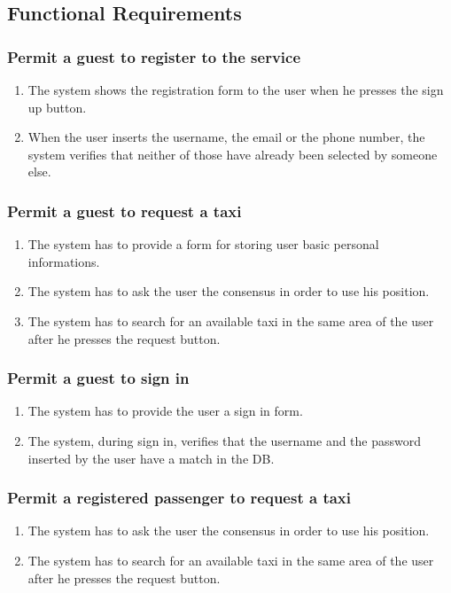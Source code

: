 	\subsection{Functional Requirements}
		\subsubsection{Permit a guest to register to the service}
			\begin{enumerate}[label=\bfseries R\arabic*:]
				\item The system shows the registration form to the user when he presses the sign up button.
				\item When the user inserts the username, the email or the phone number, the system verifies that neither of those have already been selected by someone else.
			\end{enumerate}
		\subsubsection{Permit a guest to request a taxi}
			\begin{enumerate}[label=\bfseries R\arabic*:]
				\item The system has to provide a form for storing user basic personal informations.
				\item The system has to ask the user the consensus in order to use his position.
				\item The system has to search for an available taxi in the same area of the user after he presses the request button.
			\end{enumerate}
		\subsubsection{Permit a guest to sign in}
			\begin{enumerate}[label=\bfseries R\arabic*:]
				\item The system has to provide the user a sign in form.
				\item The system, during sign in, verifies that the username and the password inserted by the user have a match in the DB.
			\end{enumerate}
		\subsubsection{Permit a registered passenger to request a taxi}
			\begin{enumerate}[label=\bfseries R\arabic*:]
				\item The system has to ask the user the consensus in order to use his position.
				\item The system has to search for an available taxi in the same area of the user after he presses the request button.
			\end{enumerate}
